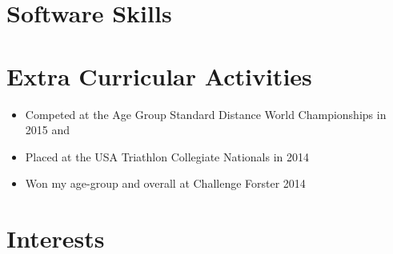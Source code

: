 \section{Software Skills}


\section{Extra Curricular Activities}

{%
\begin{itemize}
  \item Competed at the Age Group Standard Distance World Championships in 2015 and
  \item Placed  at the USA Triathlon Collegiate Nationals in 2014
  \item Won my age-group and  overall at Challenge Forster 2014
\end{itemize}
}
\vspace{1em}

\section{Interests}

\vspace{2em}


